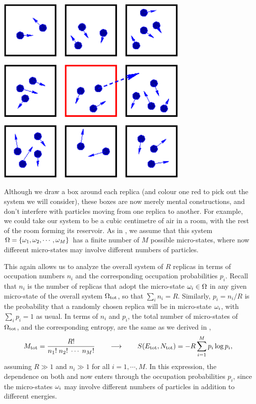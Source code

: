 \begin{center}
  \includegraphics[width=0.7\textwidth]{figs/unit06_reservoir.pdf}
\end{center}

Although we draw a box around each replica (and colour one red to pick out the system \Om we will consider), these boxes are now merely mental constructions, and don't interfere with particles moving from one replica to another.
For example, we could take our system to be a cubic centimetre of air in a room, with the rest of the room forming its reservoir.
As in , we assume that this system $\Omega = \left\{\omega_1, \omega_2, \cdots, \omega_M\right\}$ has a finite number of $M$ possible micro-states, where now different micro-states may involve different numbers of particles.

This again allows us to analyze the overall system of $R$ replicas in terms of occupation numbers $n_i$ and the corresponding occupation probabilities $p_i$.
Recall that $n_i$ is the number of replicas that adopt the micro-state $\omega_i \in \Omega$ in any given micro-state of the overall system $\Omega_{\text{tot}}$, so that $\sum_i n_i = R$.
Similarly, $p_i = n_i / R$ is the probability that a randomly chosen replica will be in micro-state $\omega_i$, with $\sum_i p_i = 1$ as usual.
In terms of $n_i$ and $p_i$, the total number of micro-states of $\Omega_{\text{tot}}$, and the corresponding entropy, are the same as we derived in ,
\begin{equation*}
  M_{\text{tot}} = \frac{R!}{n_1! \; n_2! \; \cdots \; n_M!} \qquad \longrightarrow \qquad S(E_{\text{tot}}, N_{\text{tot}}) = -R \sum_{i = 1}^M p_i \log p_i,
\end{equation*}
assuming $R \gg 1$ and $n_i \gg 1$ for all $i = 1, \cdots, M$.
In this expression, the dependence on both \Etot and \Ntot now enters through the occupation probabilities $p_i$, since the micro-states $\omega_i$ may involve different numbers of particles in addition to different energies.

